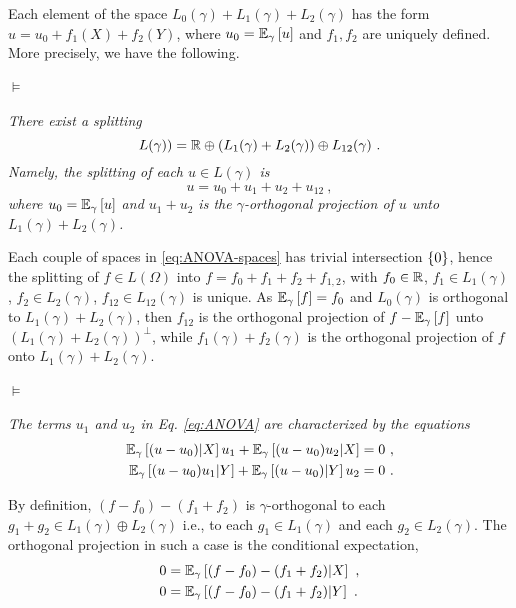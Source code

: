 \documentclass[runningheads]{llncs}
\begin{document}
Each element of the space $L_0(\gamma) + L_1(\gamma) + L_2(\gamma)$
has the form $u = u_0 + f_1(X) + f_2(Y)$, where
$u_0 = {\operatorname{\mathbb E}}_{\gamma}\left[u\right]$ and $f_1,f_2$ are uniquely defined. More
precisely, we have the following.

\paragraph{$\bm\models$} \textit{There exist a splitting
%
\begin{equation*}
%
  L(\gamma)) = \reals \oplus \left(L_1(\gamma) + L_2(\gamma)\right) \oplus L_{12}(\gamma) \ . 
\end{equation*}
%
Namely, the splitting of each $u \in L(\gamma)$ is
%
\begin{equation}
 \label{eq:ANOVA}
 u = u_0 + u_1 + u_2 + u_{12} \ ,
\end{equation}
%
where $u_0={\operatorname{\mathbb E}}_{\gamma}\left[u\right]$ and $u_1+u_2$ is the
$\gamma$-orthogonal projection of $u$ unto
$L_1(\gamma) + L_2(\gamma)$.}

Each couple of spaces in \cref{eq:ANOVA-spaces} has trivial intersection $\left\{ 0 \right\}$, hence the splitting of $f \in L(\Omega)$ into $f = f_0 + f_1 + f_2 + f_{1,2}$, with $f_0 \in \mathbb R$, $f_1 \in L_1(\gamma)$, $f_2 \in L_2(\gamma)$, $f_{12} \in L_{12}(\gamma)$ is unique. As ${\operatorname{\mathbb E}}_{\gamma}\left[f\right] = f_0$ and $L_0(\gamma)$ is orthogonal to $L_1(\gamma)+L_2(\gamma)$, then $f_{12}$ is the orthogonal projection of $f - {\operatorname{\mathbb E}}_{\gamma}\left[f\right]$ unto $(L_1(\gamma)+L_2(\gamma))^\perp$, while $f_1(\gamma)+f_2(\gamma)$ is the orthogonal projection of $f$ onto $L_1(\gamma)+L_2(\gamma)$.

\paragraph{$\bm\models$}\emph{The terms $u_1$ and $u_2$ in Eq. \cref{eq:ANOVA} are characterized by the equations
%
\begin{equation}
\label{eq:projetion}
  \begin{aligned}
    \condexpectat \gamma {(u - u_0)} X u_1 + \condexpectat \gamma {(u-u_0)u_2} X &= 0 \ , \\
    \condexpectat \gamma {(u - u_0)u_1} Y + \condexpectat \gamma {(u-u_0)} Y u_2 &= 0 \ .
  \end{aligned}
%
\end{equation}}

By definition, $(f - f_0) - (f_1 + f_2)$ is $\gamma$-orthogonal to each $g_1+g_2 \in L_1(\gamma)\oplus L_2(\gamma)$ i.e., to each $g_1 \in L_1(\gamma)$ and each $g_2 \in L_2(\gamma)$. The orthogonal projection in such a case is the conditional expectation,
%
  \begin{align*}
    0 &= {\operatorname{\mathbb E}}_{\gamma}\left[(f-f_0) - (f_1+f_2) \middle| X\right]  \ , \\
   0 &= {\operatorname{\mathbb E}}_{\gamma}\left[(f-f_0) - (f_1+f_2) \middle| Y\right] \ .
  \end{align*}
\end{document}
